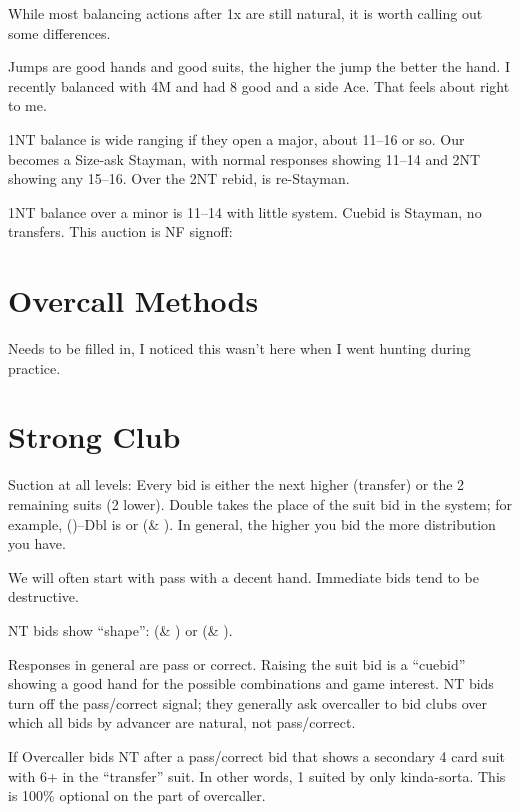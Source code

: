 \documentclass[tom-ari]{subfile}
\begin{document}
	While most balancing actions after 1x are still natural, it is worth calling out some differences.
	
	Jumps are good hands and good suits, the higher the jump the better the hand. I recently balanced with 4M and had 8 good and a side Ace. That feels about right to me.
	
	1NT balance is wide ranging if they open a major, about 11--16 or so. Our  becomes a Size-ask Stayman, with normal responses showing 11--14 and 2NT showing any 15--16. Over the 2NT rebid,  is re-Stayman.
	
	1NT balance over a minor is 11--14 with little system. Cuebid is Stayman, no transfers. This auction is NF signoff:
	
	
	\section{Overcall Methods}
	
		Needs to be filled in, I noticed this wasn't here when I went hunting during practice.
	
	\section{Strong Club}
	
	Suction at all levels: Every bid is either the next higher (transfer) or the 2 remaining suits (2 lower). Double takes the place of the suit bid in the system; for example, ()--Dbl is \diamondsuit or (\heartsuit \& \spadesuit). In general, the higher you bid the more distribution you have. 
	
	We will often start with pass with a decent hand. Immediate bids tend to be destructive.
	
	NT bids show ``shape'': (\diamondsuit \& \spadesuit) or (\clubsuit \& \heartsuit).
	
	Responses in general are pass or correct. Raising the suit bid is a ``cuebid'' showing a good hand for the possible combinations and game interest. NT bids turn off the pass/correct signal; they generally ask overcaller to bid clubs over which all bids by advancer are natural, not pass/correct.
	
	If Overcaller bids NT after a pass/correct bid that shows a secondary 4 card suit with 6+ in the ``transfer'' suit. In other words, 1 suited by only kinda-sorta. This is 100\% optional on the part of overcaller.
	
\end{document}
